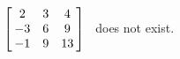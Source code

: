 {$\left[\hskip -3pt \begin{array}{ccc} 2&3&4\\  -3&6&9
\\  -1&9&13\end{array}\hskip -3pt \right]$ 
}
{\ttai\ does not exist.}
